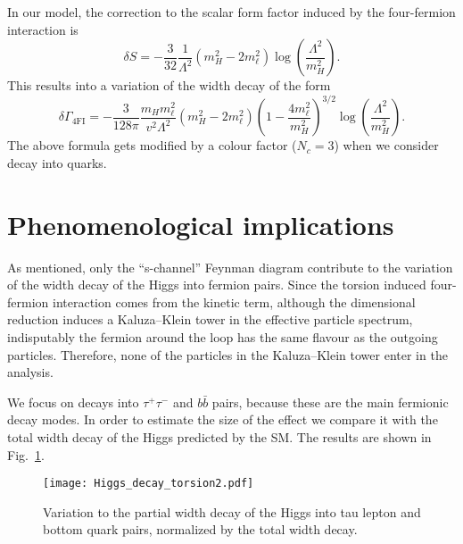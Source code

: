 \documentclass{ws-mpla}
\renewcommand{\(}{\left(}
\renewcommand{\)}{\right)}
\renewcommand{\[}{\left[}
\renewcommand{\]}{\right]}
\begin{document}
In our model, the correction to the scalar form factor induced by the four-fermion interaction is
\begin{equation}
  \delta S = - \frac{3}{32} \frac{1}{\Lambda^2} \( m_H^2 - 2 m_\ell^2 \) \log\( \frac{\Lambda^2}{m_H^2} \).
  \label{Sform}
\end{equation}
This results into a variation of the width decay  of the form
\begin{equation}
  \delta \Gamma_{\text{4FI}} = -\frac{3}{128 \pi} \frac{ m_H m_\ell^2}{v^2 \Lambda^2} \( m_H^2 - 2 m_\ell^2 \) \( 1 - \frac{4 m_\ell^2}{m_H^2} \)^{3/2} \log\( \frac{\Lambda^2}{m_H^2} \) .
\end{equation}
The above formula gets modified by a colour factor ($N_c = 3$) when we consider decay into quarks.


\section{Phenomenological implications}\label{phenom}

As mentioned, only the ``s-channel'' Feynman diagram contribute to the variation of the width decay of the Higgs into fermion pairs. Since the torsion induced four-fermion interaction comes from the kinetic term, although the dimensional reduction induces a Kaluza--Klein tower in the effective particle spectrum, indisputably the fermion around the loop has the same flavour as the outgoing particles. Therefore, none of the particles in the Kaluza--Klein tower enter in the analysis.

We focus on decays into $\tau^+ \tau^-$ and $b \bar{b}$ pairs, because these are the main fermionic decay modes. In order to estimate the size of the effect we compare it with the total width decay of the Higgs predicted by the SM. The results are shown in Fig.~\ref{fig:Hdt}.
\begin{figure}[hbt]
  \begin{center}
    \texttt{[image: Higgs\_decay\_torsion2.pdf]} 
  \end{center}
  \caption{Variation to the partial width decay of the Higgs into tau lepton and bottom quark pairs, normalized by the total width decay.}
  \label{fig:Hdt}
\end{figure}
\end{document}

